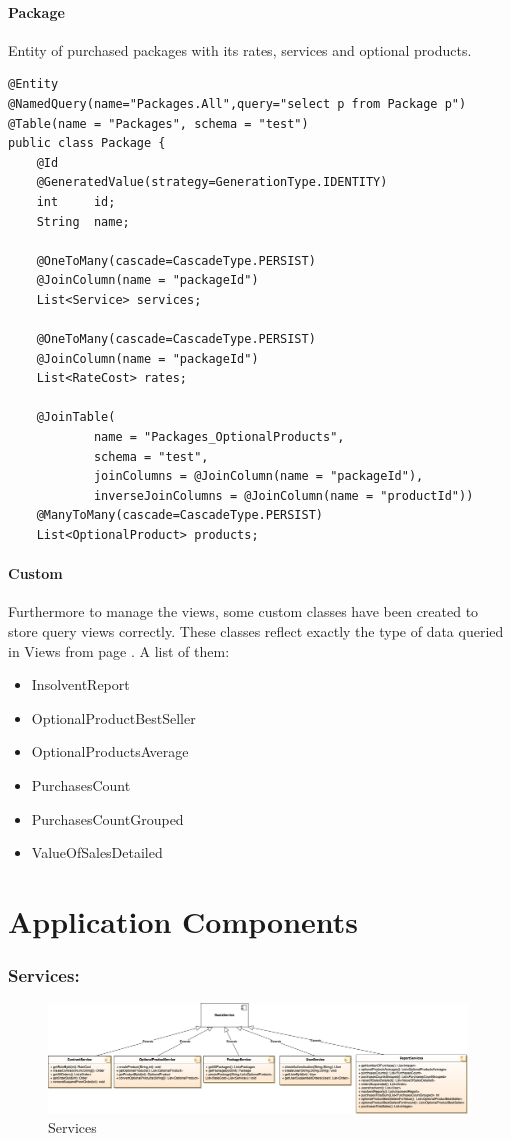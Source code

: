 \documentclass{article}
\begin{document}
\paragraph{Package}
Entity of purchased packages with its rates, services and optional products.
\begin{lstlisting}
@Entity
@NamedQuery(name="Packages.All",query="select p from Package p")
@Table(name = "Packages", schema = "test")
public class Package {
    @Id
    @GeneratedValue(strategy=GenerationType.IDENTITY)
    int     id;
    String  name;

    @OneToMany(cascade=CascadeType.PERSIST)
    @JoinColumn(name = "packageId")
    List<Service> services;

    @OneToMany(cascade=CascadeType.PERSIST)
    @JoinColumn(name = "packageId")
    List<RateCost> rates;

    @JoinTable(
            name = "Packages_OptionalProducts",
            schema = "test",
            joinColumns = @JoinColumn(name = "packageId"),
            inverseJoinColumns = @JoinColumn(name = "productId"))
    @ManyToMany(cascade=CascadeType.PERSIST)
    List<OptionalProduct> products;
\end{lstlisting}

\paragraph{Custom}
Furthermore to manage the views, some custom classes have been created to store query views correctly. These classes reflect exactly the type of data queried in Views from page \pageref{views}.
A list of them:
\begin{itemize}
    \item InsolventReport
    \item OptionalProductBestSeller
    \item OptionalProductsAverage
    \item PurchasesCount
    \item PurchasesCountGrouped
    \item ValueOfSalesDetailed
\end{itemize}

\newpage
\section{Application Components}
\subsubsection{Services:}
\begin{figure}[hbt!]
\centering
\includegraphics[width=0.99\textwidth]{services.png}
\caption{Services}
\end{figure}
\end{document}
